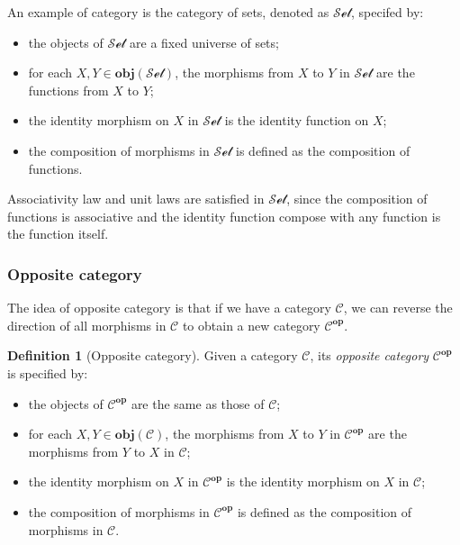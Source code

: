 \documentclass[12pt,twoside,a4paper]{report}
\theoremstyle{definition}
\newtheorem*{definition*}{Definition}
\theoremstyle{definition}
\begin{document}
        An example of category is the category of sets, denoted as $\mathcal{Set}$, specifed by:
        \begin{itemize}
            \item 
                the objects of $\mathcal{Set}$ are a fixed universe of sets;
            \item
                for each $X, Y \in \textbf{obj}(\mathcal{Set})$, the morphisms from $X$ to $Y$ in $\mathcal{Set}$ are the functions from $X$ to $Y$;
            \item
                the identity morphism on $X$ in $\mathcal{Set}$ is the identity function on $X$;
            \item
                the composition of morphisms in $\mathcal{Set}$ is defined as the composition of functions.
        \end{itemize}
        Associativity law and unit laws are satisfied in $\mathcal{Set}$, since the composition of functions is associative and the identity function compose with any function is the function itself.

            \subsubsection{Opposite category}
            The idea of opposite category is that if we have a category $\mathcal{C}$, we can reverse the direction of all morphisms in $\mathcal{C}$ to obtain a new category $\mathcal{C}^{\textbf{op}}$.

            \begin{definition*}[Opposite category]
                Given a category $\mathcal{C}$, its \emph{opposite category} $\mathcal{C}^{\textbf{op}}$ is specified by:
                \begin{itemize}
                    \item 
                        the objects of $\mathcal{C}^{\textbf{op}}$ are the same as those of $\mathcal{C}$;
                    \item 
                        for each $X, Y \in \textbf{obj}(\mathcal{C})$, the morphisms from $X$ to $Y$ in $\mathcal{C}^{\textbf{op}}$ are the morphisms from $Y$ to $X$ in $\mathcal{C}$;
                    \item 
                        the identity morphism on $X$ in $\mathcal{C}^{\textbf{op}}$ is the identity morphism on $X$ in $\mathcal{C}$;
                    \item 
                        the composition of morphisms in $\mathcal{C}^{\textbf{op}}$ is defined as the composition of morphisms in $\mathcal{C}$.
                \end{itemize}
            \end{definition*}
\end{document}
